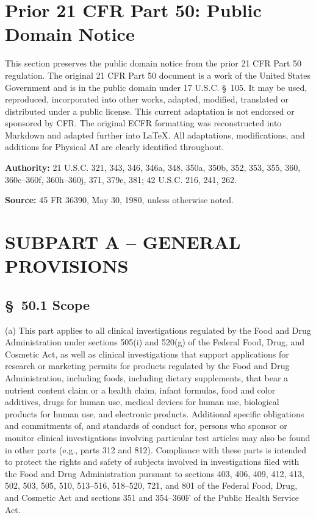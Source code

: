 \documentclass[11pt]{article}
\begin{document}
\clearpage
{}

\section*{Prior 21 CFR Part 50: Public Domain Notice}

This section preserves the public domain notice from the prior 21 CFR Part 50 regulation. The original 21 CFR Part 50 document is a work of the United States Government and is in the public domain under 17 U.S.C. \S~105. It may be used, reproduced, incorporated into other works, adapted, modified, translated or distributed under a public license. This current adaptation is not endorsed or sponsored by CFR. The original ECFR formatting was reconstructed into Markdown and adapted further into LaTeX. All adaptations, modifications, and additions for Physical AI are clearly identified throughout.

\textbf{Authority:} 21 U.S.C. 321, 343, 346, 346a, 348, 350a, 350b, 352, 353, 355, 360, 360c--360f, 360h--360j, 371, 379e, 381; 42 U.S.C. 216, 241, 262.

\textbf{Source:} 45 FR 36390, May 30, 1980, unless otherwise noted.

\section{SUBPART A -- GENERAL PROVISIONS}

\subsection{\S~50.1 Scope}

(a) This part applies to all clinical investigations regulated by the Food and Drug Administration under sections 505(i) and 520(g) of the Federal Food, Drug, and Cosmetic Act, as well as clinical investigations that support applications for research or marketing permits for products regulated by the Food and Drug Administration, including foods, including dietary supplements, that bear a nutrient content claim or a health claim, infant formulas, food and color additives, drugs for human use, medical devices for human use, biological products for human use, and electronic products. Additional specific obligations and commitments of, and standards of conduct for, persons who sponsor or monitor clinical investigations involving particular test articles may also be found in other parts (e.g., parts 312 and 812). Compliance with these parts is intended to protect the rights and safety of subjects involved in investigations filed with the Food and Drug Administration pursuant to sections 403, 406, 409, 412, 413, 502, 503, 505, 510, 513--516, 518--520, 721, and 801 of the Federal Food, Drug, and Cosmetic Act and sections 351 and 354--360F of the Public Health Service Act.
\end{document}
